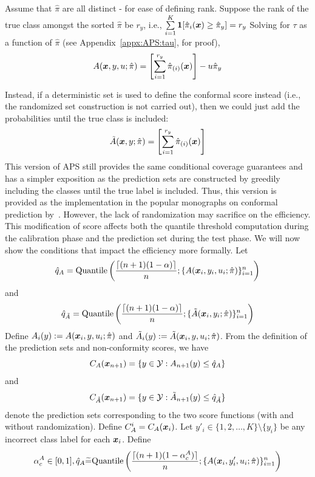 Assume that $\hat{\pi}$ are all distinct - for ease of defining rank.
Suppose the rank of the true class amongst the sorted $\hat{\pi}$ be $r_y$, i.e., $\sum\limits_{i=1}^K \bm{1}[\hat{\pi}_i({\bm{x}}) \geq \hat{\pi}_{y}] = r_y$
Solving for $\tau$ as a function of $\hat{\pi}$  (see Appendix~\ref{appx:APS:tau}, for proof),
\begin{align}
A({\bm{x}}, y, u;\hat{\pi}) = \left[ \sum\limits_{i=1}^{r_y} \hat{\pi}_{(i)}({\bm{x}}) \right] - u \hat{\pi}_{y}
\end{align}

Instead, if a deterministic set is used to define the conformal score instead (i.e., the randomized set construction is not carried out), then we could just add the probabilities until the true class is included:
\begin{align}
    \Tilde{A}({\bm{x}}, y;\hat{\pi}) = \left[ \sum\limits_{i=1}^{r_y} \hat{\pi}_{(i)}({\bm{x}}) \right]
\end{align}
This version of APS still provides the same conditional coverage guarantees and has a simpler exposition as the prediction sets are constructed by greedily including the classes until the true label is included.
 Thus, this version is provided as the implementation in the popular monographs on conformal prediction by~\citet{angelopoulos2021gentle, angelopoulos2023conformal}.
However, the lack of randomization may sacrifice on the efficiency. 
This modification of score affects both the quantile threshold computation during the calibration phase and the prediction set during the test phase.
We will now show the conditions that impact the efficiency more formally.
Let 
\[
    \hat{q}_{A} = \text{Quantile}\left(\frac{\lceil(n+1)(1-\alpha)\rceil}{n}; \{A({\bm{x}}_i, y_i, u_i; \hat{\pi})\}_{i=1}^{n}\right)
\]
and
\[
    \hat{q}_{\Tilde{A}} = \text{Quantile}\left(\frac{\lceil(n+1)(1-\alpha)\rceil}{n}; \{\Tilde{A}({\bm{x}}_i, y_i; \hat{\pi})\}_{i=1}^{n}\right)
\]
Define $A_i(y) := A({\bm{x}}_i, y, u_i; \hat{\pi})$ and $\Tilde{A}_i(y) := \Tilde{A}({\bm{x}}_i, y, u_i; \hat{\pi})$. From the definition of the prediction sets and non-conformity scores, we have 
\[
    C_A({\bm{x}}_{n+1}) = \{y \in {\mathcal{Y}}: A_{n+1}(y) \leq \hat{q}_{A}\}
\] and 
\[
    C_{\Tilde{A}}({\bm{x}}_{n+1}) = \{y \in {\mathcal{Y}}: \Tilde{A}_{n+1}(y) \leq \hat{q}_{\Tilde{A}}\}
\] 
denote the prediction sets corresponding to the two score functions (with and without randomization).
Define $C_{A}^{i} = C_{A}({\bm{x}}_{i})$. 
Let $y'_i \in \{1, 2, \dots, K\} \setminus \{y_i\}$ be any incorrect class label for each ${\bm{x}}_i$.
Define 
\[
    \alpha_c^A \in [0, 1], \hat{q}_A \widetilde{=} \text{Quantile}\left( \frac{\lceil(n+1)(1 - \alpha_c^A)\rceil}{n}; \{A({\bm{x}}_i, y'_i, u_i; \hat{\pi})\}_{i=1}^n \right)
\]

